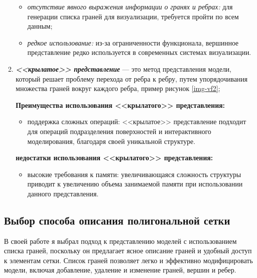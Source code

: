 \begin{enumerate}
	\begin{itemize}
		\item \textit{отсутствие явного выражения информации о гранях и ребрах:} для генерации списка граней для визуализации, требуется пройти по всем данным;
		\item \textit{редкое использование: }из-за ограниченности функционала, вершинное представление редко используется в современных системах визуализации.
	\end{itemize}
	
	
	
	\item \textit{\textbf{<<крылатое>> представление}} --- это метод представления модели, который решает проблему перехода от ребра к ребру, путем упорядочивания множества граней вокруг каждого ребра, пример рисунок \ref{img-vf2};
	
	
	\textbf{Преимущества использования <<крылатого>> представления:}

	\begin{itemize}
		\item поддержка сложных операций: <<крылатое>> представление подходит для операций подразделения поверхностей и интерактивного моделирования, благодаря своей уникальной структуре.
		\end{itemize}

	\textbf{недостатки использования <<крылатого>> представления:}

	\begin{itemize}
		\item высокие требования к памяти: увеличивающаяся сложность структуры приводит к увеличению объема занимаемой памяти при использовании данного представления.
	\end{itemize}
	

\end{enumerate}


\subsection{Выбор способа описания полигональной сетки} %

В своей работе я выбрал подход к представлению моделей с использованием списка граней, поскольку он предлагает ясное описание граней и удобный доступ к элементам сетки. Список граней позволяет легко и эффективно модифицировать модели, включая добавление, удаление и изменение граней, вершин и ребер. %

